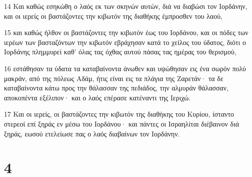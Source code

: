 \par 14 Και καθώς εσηκώθη ο λαός εκ των σκηνών αυτών, διά να διαβώσι τον Ιορδάνην, και οι ιερείς οι βαστάζοντες την κιβωτόν της διαθήκης έμπροσθεν του λαού,
\par 15 και καθώς ήλθον οι βαστάζοντες την κιβωτόν έως του Ιορδάνου, και οι πόδες των ιερέων των βασταζόντων την κιβωτόν εβράχησαν κατά το χείλος του ύδατος, διότι ο Ιορδάνης πλημμυρεί καθ' όλας τας όχθας αυτού πάσας τας ημέρας του θερισμού,
\par 16 εστάθησαν τα ύδατα τα καταβαίνοντα άνωθεν και υψώθησαν εις ένα σωρόν πολύ μακράν, από της πόλεως Αδάμ, ήτις είναι εις τα πλάγια της Ζαρετάν· τα δε καταβαίνοντα κάτω προς την θάλασσαν της πεδιάδος, την αλμυράν θάλασσαν, αποκοπέντα εξέλιπον· και ο λαός επέρασε κατέναντι της Ιεριχώ.
\par 17 Και οι ιερείς, οι βαστάζοντες την κιβωτόν της διαθήκης του Κυρίου, ίσταντο στερεοί επί ξηράς εν μέσω του Ιορδάνου· και πάντες οι Ισραηλίται διέβαινον διά ξηράς, εωσού ετελείωσε πας ο λαός διαβαίνων τον Ιορδάνην.

\chapter{4}

